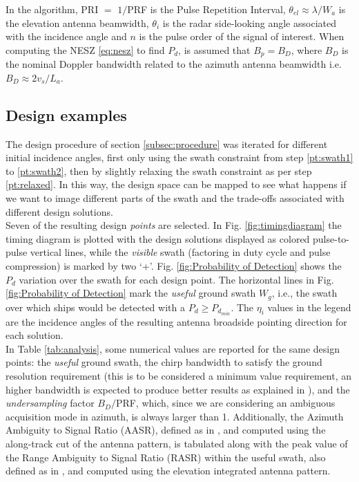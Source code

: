 \documentclass[conference,a4paper]{IEEEtran}
\begin{document}
    In the algorithm, PRI $=$ $1/$PRF is the Pulse Repetition Interval, $\theta_{el} \approx \lambda/W_a$ is the elevation antenna beamwidth, $\theta_i$ is the radar side-looking angle associated with the incidence angle and $n$ is the pulse order of the signal of interest.
    When computing the NESZ \eqref{eq:nesz} to find $P_d$, is assumed that $B_p = B_D$, where $B_D$ is the nominal Doppler bandwidth related to the azimuth antenna beamwidth i.e. $B_D \approx 2 v_s / L_a$.

    \subsection{Design examples}
    \label{subsec:analysis}
    The design procedure of section \ref{subsec:procedure} was iterated for different initial incidence angles, first only using the swath constraint from step \ref{pt:swath1} to \ref{pt:swath2}, then by slightly relaxing the swath constraint as per step \ref{pt:relaxed}.
    In this way, the design space can be mapped to see what happens if we want to image different parts of the swath and the trade-offs associated with different design solutions.\\
    Seven of the resulting design \emph{points} are selected.
    In Fig. \ref{fig:timingdiagram} the timing diagram is plotted with the design solutions displayed as colored pulse-to-pulse vertical lines, while the \emph{visible} swath (factoring in duty cycle and pulse compression) is marked by two `+'.
    Fig. \ref{fig:Probability of Detection} shows the $P_d$ variation over the swath for each design point.
    The horizontal lines in Fig. \ref{fig:Probability of Detection} mark the \emph{useful} ground swath $W_g$, i.e., the swath over which ships would be detected with a $P_d \geq P_{d_{min}}$.
    The $\eta_i$ values in the legend are the incidence angles of the resulting antenna broadside pointing direction for each solution.\\
    In Table \ref{tab:analysis}, some numerical values are reported for the same design points: the \emph{useful} ground swath, the chirp bandwidth to satisfy the ground resolution requirement (this is to be considered a minimum value requirement, an higher bandwidth is expected to produce better results as explained in \cite{DLRjournal}), and the \emph{undersampling} factor $B_D/$PRF, which, since we are considering an ambiguous acquisition mode in azimuth, is always larger than 1.
    Additionally, the Azimuth Ambiguity to Signal Ratio (AASR), defined as in \cite{curlander1991synthetic}, and computed using the along-track cut of the antenna pattern, is tabulated along with the peak value of the Range Ambiguity to Signal Ratio (RASR) within the useful swath, also defined as in \cite{curlander1991synthetic}, and computed using the elevation integrated antenna pattern.
\end{document}
